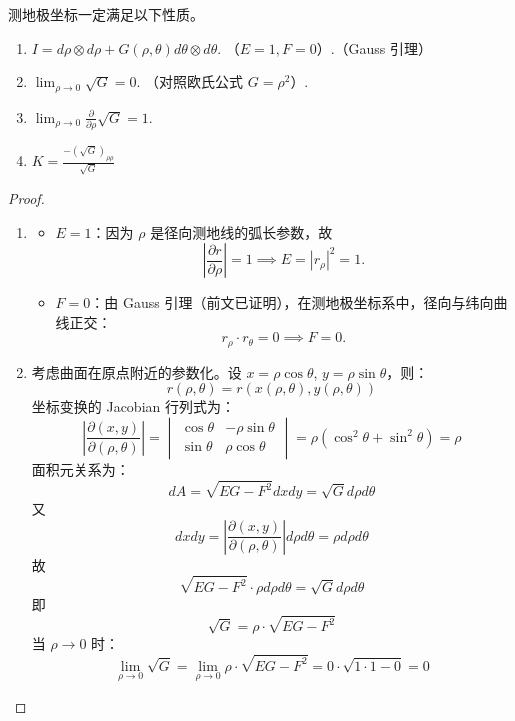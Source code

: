 \documentclass[lang=cn,10pt,thmcnt=section]{elegantbook}
\begin{document}
\begin{proposition}
    测地极坐标一定满足以下性质。

\begin{enumerate}
    \item $I = d\rho \otimes d\rho + G(\rho, \theta) d\theta \otimes d\theta.$ （$E = 1, F = 0$）.（Gauss 引理）
    \item $\lim_{\rho \to 0} \sqrt{G} = 0.$ （对照欧氏公式 $G = \rho^2$）.
    \item $\lim_{\rho \to 0} \frac{\partial}{\partial \rho} \sqrt{G} = 1.$
    \item $K = \frac{-(\sqrt{G})_{\rho\rho}}{\sqrt{G}}$
\end{enumerate}
\end{proposition}
\begin{proof}
    \begin{enumerate}
        \item \begin{itemize}
            \item \( E = 1 \)：因为 \(\rho\) 是径向测地线的弧长参数，故
            \[
            \left| \frac{\partial r}{\partial \rho} \right| = 1 \implies E = \left| r_\rho \right|^2 = 1.
            \]
            \item \( F = 0 \)：由 Gauss 引理（前文已证明），在测地极坐标系中，径向与纬向曲线正交：
            \[
            r_\rho \cdot r_\theta = 0 \implies F = 0.
            \]
        \end{itemize}
        \item  考虑曲面在原点附近的参数化。设 \( x = \rho \cos \theta \), \( y = \rho \sin \theta \)，则：
        \[
        r(\rho, \theta) = r(x(\rho, \theta), y(\rho, \theta))
        \]
        坐标变换的 Jacobian 行列式为：
        \[
        \left| \frac{\partial (x, y)}{\partial (\rho, \theta)} \right| = \begin{vmatrix}
        \cos \theta & -\rho \sin \theta \\
        \sin \theta & \rho \cos \theta
        \end{vmatrix} = \rho (\cos^2 \theta + \sin^2 \theta) = \rho
        \]
        面积元关系为：
        \[
        dA = \sqrt{EG - F^2}  dx  dy = \sqrt{G}  d\rho  d\theta
        \]
        又
        \[
        dx  dy = \left| \frac{\partial (x, y)}{\partial (\rho, \theta)} \right| d\rho  d\theta = \rho  d\rho  d\theta
        \]
        故
        \[
        \sqrt{EG - F^2} \cdot \rho  d\rho  d\theta = \sqrt{G}  d\rho  d\theta
        \]
        即
        \[
        \sqrt{G} = \rho \cdot \sqrt{EG - F^2}
        \]
        当 \(\rho \to 0\) 时：
        \[
        \lim_{\rho \to 0} \sqrt{G} = \lim_{\rho \to 0} \rho \cdot \sqrt{EG - F^2} = 0 \cdot \sqrt{1 \cdot 1 - 0} = 0
        \]


\end{enumerate}
\end{proof}
\end{document}
